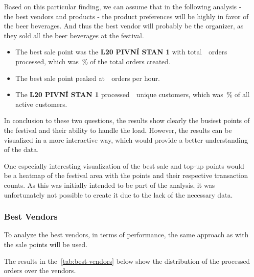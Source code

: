 Based on this particular finding, we can assume that in the following analysis - the best vendors and products - the product preferences will be highly in favor of the beer beverages.
And thus the best vendor will probably be the organizer, as they sold all the beer beverages at the festival.

\begin{keytakeaways}
	\begin{itemize}
		\item The best sale point was the \textbf{L20 PIVNÍ STAN 1} with total~~orders processed, which was~\% of the total orders created.
		\item The best sale point peaked at~~orders per hour.
		\item The \textbf{L20 PIVNÍ STAN 1} processed~~unique customers, which was~\% of all active customers.
	\end{itemize}
\end{keytakeaways}

In conclusion to these two questions, the results show clearly the busiest points of the festival and their ability to handle the load.
However, the results can be visualized in a more interactive way, which would provide a better understanding of the data.

One especially interesting visualization of the best sale and top-up points would be a heatmap of the festival area with the points and their respective transaction counts.
As this was initially intended to be part of the analysis, it was unfortunately not possible to create it due to the lack of the necessary data.


\subsubsection{Best Vendors}
\label{subsubsec:analysis-best-vendors}

To analyze the best vendors, in terms of performance, the same approach as with the sale points will be used.
\begin{rqbox}
	\textit{}
\end{rqbox}

The results in the~\autoref{tab:best-vendors} below show the distribution of the processed orders over the vendors.

